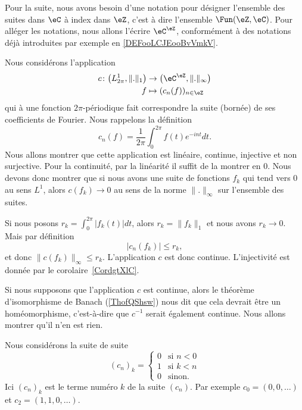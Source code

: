 Pour la suite, nous avons besoin d'une notation pour désigner l'ensemble des suites dans \( \eC\) à index dans \( \eZ\), c'est à dire l'ensemble \( \Fun(\eZ,\eC)\). Pour alléger les notations, nous allons l'écrire \( \eC^{\eZ}\), conformément à des notations déjà introduites par exemple en \ref{DEFooLCJEooBvVmkV}.

Nous considérons l'application
\begin{equation}
	\begin{aligned}
		c\colon \big( L^1_{2\pi},\| . \|_1 \big) & \to \big( \eC^{\eZ},\| .\|_{\infty} \big) \\
		f                                        & \mapsto (c_n(f))_{n\in \eZ}
	\end{aligned}
\end{equation}
qui à une fonction \( 2\pi\)-périodique fait correspondre la suite (bornée) de ses coefficients de Fourier. Nous rappelons la définition
\begin{equation}
	c_n(f)=\frac{1}{ 2\pi }\int_0^{2\pi}f(t) e^{-int} dt.
\end{equation}
Nous allons montrer que cette application est linéaire, continue, injective et non surjective. Pour la continuité, par la linéarité il suffit de la montrer en \( 0\). Nous devons donc montrer que si nous avons une suite de fonctions \( f_k\) qui tend vers \( 0\) au sens \( L^1\), alors \( c(f_k)\to 0\) au sens de la norme \( \| . \|_{\infty}\) sur l'ensemble des suites.

Si nous posons \( r_k=\int_0^{2\pi}| f_k(t) |dt\), alors \( r_k=\| f_k \|_1\) et nous avons \( r_k\to 0\). Mais par définition
\begin{equation}
	| c_n(f_k) |\leq r_k,
\end{equation}
et donc \( \| c(f_k) \|_{\infty}\leq r_k\). L'application \( c\) est donc continue. L'injectivité est donnée par le corolaire~\ref{CordgtXlC}.

Si nous supposons que l'application \( c\) est continue, alors le théorème d'isomorphisme de Banach (\ref{ThofQShsw}) nous dit que cela devrait être un homéomorphisme, c'est-à-dire que \( c^{-1}\) serait également continue. Nous allons montrer qu'il n'en est rien.

Nous considérons la suite de suite
\begin{equation}    \label{EqdMtbOB}
	(c_n)_k=\begin{cases}
		0 & \text{si } n<0 \\
		1 & \text{si } k<n \\
		0 & \text{sinon}.
	\end{cases}
\end{equation}
Ici \( (c_n)_k\) est le terme numéro \( k\) de la suite \( (c_n)\). Par exemple \( c_0=(0,0,\ldots )\) et \( c_2=(1,1,0,\ldots)\).

